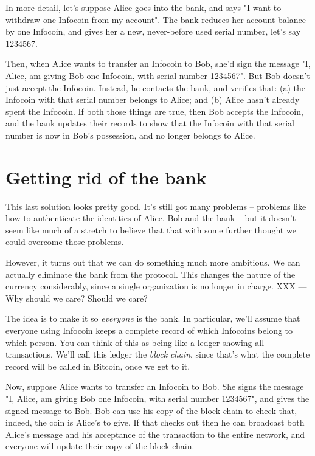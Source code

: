 \documentclass[12pt]{book}
\newcounter{problem}[chapter]
\begin{document}
In more detail, let's suppose Alice goes into the bank, and says "I
want to withdraw one Infocoin from my account".  The bank reduces her
account balance by one Infocoin, and gives her a new, never-before
used serial number, let's say 1234567.

Then, when Alice wants to transfer an Infocoin to Bob, she'd sign the
message "I, Alice, am giving Bob one Infocoin, with serial number
1234567".  But Bob doesn't just accept the Infocoin.  Instead, he
contacts the bank, and verifies that: (a) the Infocoin with that
serial number belongs to Alice; and (b) Alice hasn't already spent the
Infocoin.  If both those things are true, then Bob accepts the
Infocoin, and the bank updates their records to show that the Infocoin
with that serial number is now in Bob's possession, and no longer
belongs to Alice.

\section{Getting rid of the bank}

This last solution looks pretty good.  It's still got many problems --
problems like how to authenticate the identities of Alice, Bob and the
bank -- but it doesn't seem like much of a stretch to believe that
that with some further thought we could overcome those problems.

However, it turns out that we can do something much more ambitious.
We can actually eliminate the bank from the protocol.  This changes
the nature of the currency considerably, since a single organization
is no longer in charge.  XXX --- Why should we care?  Should we care?

The idea is to make it so \emph{everyone} is the bank.  In particular,
we'll assume that everyone using Infocoin keeps a complete record of
which Infocoins belong to which person.  You can think of this as
being like a ledger showing all transactions.  We'll call this ledger
the \emph{block chain}, since that's what the complete record will be
called in Bitcoin, once we get to it.

Now, suppose Alice wants to transfer an Infocoin to Bob.  She signs
the message "I, Alice, am giving Bob one Infocoin, with serial number
1234567", and gives the signed message to Bob.  Bob can use his copy
of the block chain to check that, indeed, the coin is Alice's to give.
If that checks out then he can broadcast both Alice's message and his
acceptance of the transaction to the entire network, and everyone will
update their copy of the block chain.
\end{document}
